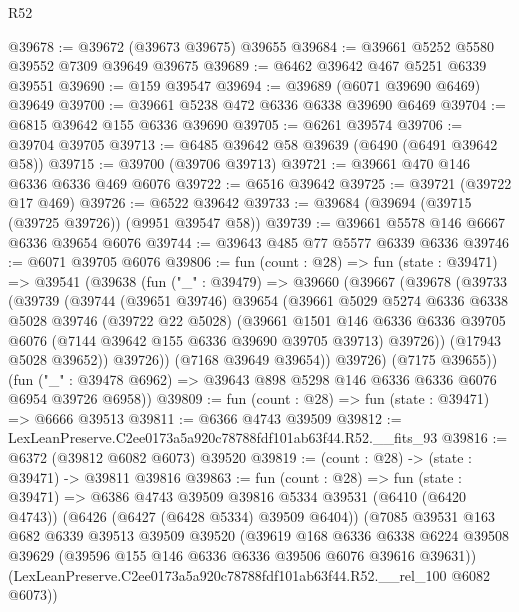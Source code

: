 \begin{lexlean}{R52}
\begin{coremodule}
@39678 := @39672 (@39673 @39675) @39655
@39684 := @39661 @5252 @5580 @39552 @7309 @39649 @39675
@39689 := @6462 @39642 @467 @5251 @6339 @39551
@39690 := @159 @39547
@39694 := @39689 (@6071 @39690 @6469) @39649
@39700 := @39661 @5238 @472 @6336 @6338 @39690 @6469
@39704 := @6815 @39642 @155 @6336 @39690
@39705 := @6261 @39574
@39706 := @39704 @39705
@39713 := @6485 @39642 @58 @39639 (@6490 (@6491 @39642 @58))
@39715 := @39700 (@39706 @39713)
@39721 := @39661 @470 @146 @6336 @6336 @469 @6076
@39722 := @6516 @39642
@39725 := @39721 (@39722 @17 @469)
@39726 := @6522 @39642
@39733 := @39684 (@39694 (@39715 (@39725 @39726)) (@9951 @39547 @58))
@39739 := @39661 @5578 @146 @6667 @6336 @39654 @6076
@39744 := @39643 @485 @77 @5577 @6339 @6336
@39746 := @6071 @39705 @6076
@39806 := fun (count : @28) =>
  fun (state : @39471) =>
  @39541
    (@39638
      (fun ("_" : @39479) =>
      @39660
        (@39667
          (@39678
            (@39733
              (@39739
                (@39744
                  (@39651 @39746)
                  @39654
                  (@39661
                    @5029
                    @5274
                    @6336
                    @6338
                    @5028
                    @39746
                    (@39722 @22 @5028)
                    (@39661
                      @1501
                      @146
                      @6336
                      @6336
                      @39705
                      @6076
                      (@7144 @39642 @155 @6336 @39690 @39705 @39713)
                      @39726))
                  (@17943 @5028 @39652))
                @39726))
            (@7168 @39649 @39654))
          @39726)
        (@7175 @39655))
      (fun ("_" : @39478 @6962) => @39643 @898 @5298 @146 @6336 @6336 @6076 @6954 @39726 @6958))
@39809 := fun (count : @28) => fun (state : @39471) => @6666 @39513
@39811 := @6366 @4743 @39509
@39812 := LexLeanPreserve.C2ee0173a5a920c78788fdf101ab63f44.R52.__fits_93
@39816 := @6372 (@39812 @6082 @6073) @39520
@39819 := (count : @28) -> (state : @39471) -> @39811 @39816
@39863 := fun (count : @28) =>
  fun (state : @39471) =>
  @6386
    @4743
    @39509
    @39816
    @5334
    @39531
    (@6410 (@6420 @4743))
    (@6426 (@6427 (@6428 @5334) @39509 @6404))
    (@7085
      @39531
      @163
      @682
      @6339
      @39513
      @39509
      @39520
      (@39619
        @168
        @6336
        @6338
        @6224
        @39508
        @39629
        (@39596 @155 @146 @6336 @6336 @39506 @6076 @39616 @39631))
      (LexLeanPreserve.C2ee0173a5a920c78788fdf101ab63f44.R52.__rel_100 @6082 @6073))

\end{coremodule}
\end{lexlean}
